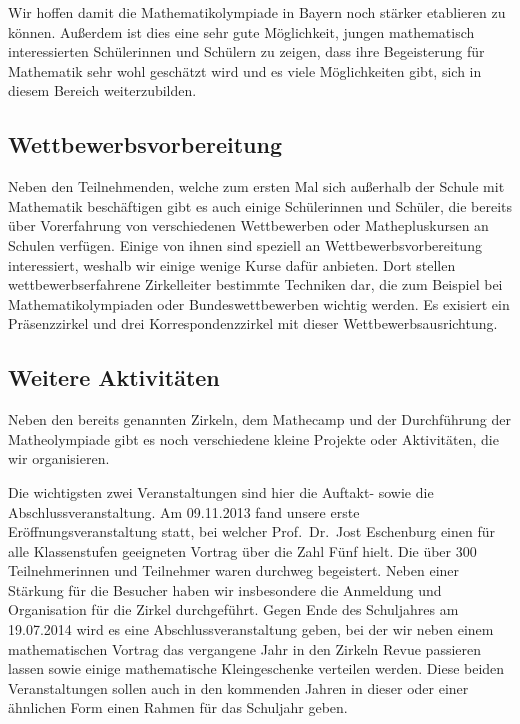 \documentclass[12pt]{zettel}
\begin{document}
Wir hoffen damit die Mathematikolympiade in Bayern noch stärker
etablieren zu können. Außerdem ist dies eine sehr gute Möglichkeit,
jungen mathematisch interessierten Schülerinnen und Schülern zu zeigen,
dass ihre Begeisterung für Mathematik sehr wohl geschätzt wird und es
viele Möglichkeiten gibt, sich in diesem Bereich weiterzubilden.

\subsection{Wettbewerbsvorbereitung}

Neben den Teilnehmenden, welche zum ersten Mal sich außerhalb der Schule
mit Mathematik beschäftigen gibt es auch einige Schülerinnen und
Schüler, die bereits über Vorerfahrung von verschiedenen Wettbewerben
oder Mathepluskursen an Schulen verfügen. Einige von ihnen sind speziell
an Wettbewerbsvorbereitung interessiert, weshalb wir einige wenige Kurse
dafür anbieten. Dort stellen wettbewerbserfahrene Zirkelleiter bestimmte
Techniken dar, die zum Beispiel bei Mathematikolympiaden oder
Bundeswettbewerben wichtig werden. Es exisiert ein Präsenzzirkel und
drei Korrespondenzzirkel mit dieser Wettbewerbsausrichtung.

\subsection{Weitere Aktivitäten}

Neben den bereits genannten Zirkeln, dem Mathecamp und der Durchführung
der Matheolympiade gibt es noch verschiedene kleine Projekte oder
Aktivitäten, die wir organisieren.

Die wichtigsten zwei Veranstaltungen sind hier die Auftakt- sowie die
Abschlussveranstaltung. Am 09.11.2013 fand unsere erste
Eröffnungsveranstaltung statt, bei welcher Prof.~Dr.~Jost Eschenburg
einen für alle Klassenstufen geeigneten Vortrag über die Zahl Fünf
hielt. Die über 300 Teilnehmerinnen und Teilnehmer waren durchweg
begeistert. Neben einer Stärkung für die Besucher haben wir insbesondere
die Anmeldung und Organisation für die Zirkel durchgeführt. Gegen Ende
des Schuljahres am 19.07.2014 wird es eine Abschlussveranstaltung geben,
bei der wir neben einem mathematischen Vortrag das vergangene Jahr in
den Zirkeln Revue passieren lassen sowie einige mathematische
Kleingeschenke verteilen werden. Diese beiden Veranstaltungen sollen
auch in den kommenden Jahren in dieser oder einer ähnlichen Form einen
Rahmen für das Schuljahr geben.
\end{document}
